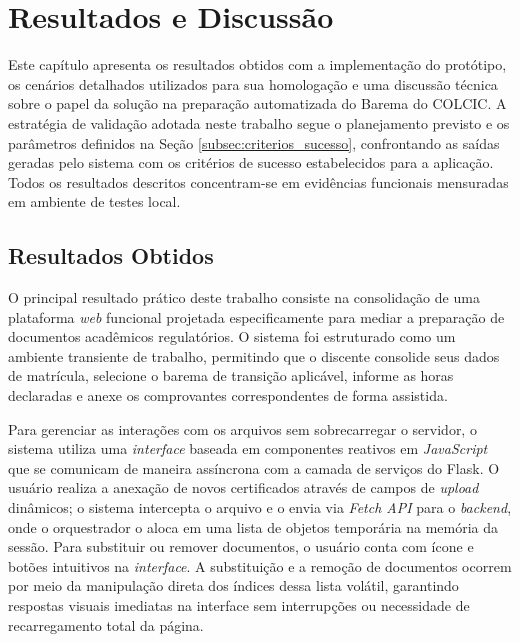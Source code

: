 \chapter{Resultados e Discussão}
\label{cap:resultados}


Este capítulo apresenta os resultados obtidos com a implementação do protótipo, os cenários detalhados utilizados para sua homologação e uma discussão técnica sobre o papel da solução na preparação automatizada do Barema do COLCIC. A estratégia de validação adotada neste trabalho segue o planejamento previsto e os parâmetros definidos na Seção \ref{subsec:criterios_sucesso}, confrontando as saídas geradas pelo sistema com os critérios de sucesso estabelecidos para a aplicação. Todos os resultados descritos concentram-se em evidências funcionais mensuradas em ambiente de testes local.

\section{Resultados Obtidos}


O principal resultado prático deste trabalho consiste na consolidação de uma plataforma \textit{web} funcional projetada especificamente para mediar a preparação de documentos acadêmicos regulatórios. O sistema foi estruturado como um ambiente transiente de trabalho, permitindo que o discente consolide seus dados de matrícula, selecione o barema de transição aplicável, informe as horas declaradas e anexe os comprovantes correspondentes de forma assistida.

Para gerenciar as interações com os arquivos sem sobrecarregar o servidor, o sistema utiliza uma \textit{interface} baseada em componentes reativos em \textit{JavaScript} que se comunicam de maneira assíncrona com a camada de serviços do Flask\texttrademark{}. O usuário realiza a anexação de novos certificados através de campos de \textit{upload} dinâmicos; o sistema intercepta o arquivo e o envia via \textit{Fetch API} para o \textit{backend}, onde o orquestrador o aloca em uma lista de objetos temporária na memória da sessão. Para substituir ou remover documentos, o usuário conta com ícone e botões intuitivos na \textit{interface}. A substituição e a remoção de documentos ocorrem por meio da manipulação direta dos índices dessa lista volátil, garantindo respostas visuais imediatas na interface sem interrupções ou necessidade de recarregamento total da página. 

